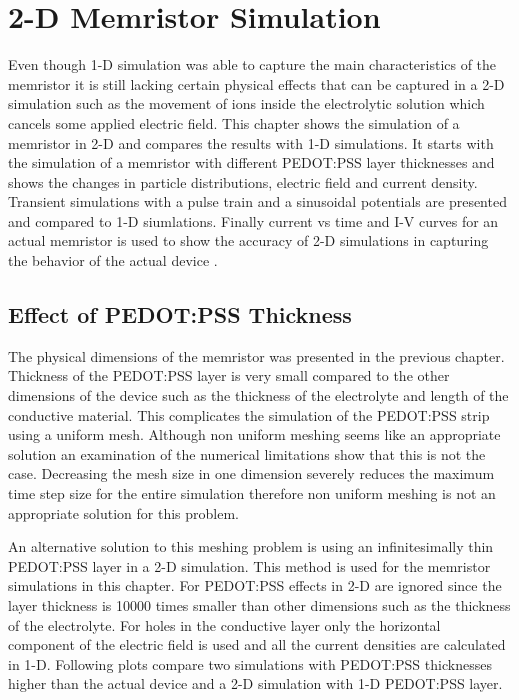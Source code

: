 
\chapter{2-D Memristor Simulation} %

\label{Chapter6} %

\begin{doublespace}

Even though 1-D simulation was able to capture the main characteristics of the memristor it is still lacking certain physical effects that can be captured in a 2-D simulation such as the movement of ions inside the electrolytic solution which cancels some applied electric field. This chapter shows the simulation of a memristor in 2-D and compares the results with 1-D simulations. It starts with the simulation of a memristor with different PEDOT:PSS layer thicknesses and shows the changes in particle distributions, electric field and current density. 
Transient simulations with a pulse train and a sinusoidal potentials are presented and compared to 1-D siumlations. Finally current vs time and I-V curves for an actual memristor is used to show the accuracy of 2-D simulations in capturing the behavior of the actual device .  

\section{Effect of PEDOT:PSS Thickness}

The physical dimensions of the memristor was presented in the previous chapter. Thickness of the PEDOT:PSS layer is very small compared to the other dimensions of the device such as the thickness of the electrolyte and length of the conductive material. This complicates the simulation of the PEDOT:PSS strip using a uniform mesh. Although non uniform meshing seems like an appropriate solution an examination of the numerical limitations show that this is not the case. Decreasing the mesh size in one dimension severely reduces the maximum time step size for the entire simulation therefore non uniform meshing is not an appropriate solution for this problem. 

An alternative solution to this meshing problem is using an infinitesimally thin PEDOT:PSS layer in a 2-D simulation. This method is used for the memristor simulations in this chapter. For PEDOT:PSS effects in 2-D are ignored since the layer thickness is 10000 times smaller than other dimensions such as the thickness of the electrolyte. For holes in the conductive layer only the horizontal component of the electric field is used and all the current densities are calculated in 1-D. Following plots compare two simulations with PEDOT:PSS thicknesses higher than the actual device and a 2-D simulation with 1-D PEDOT:PSS layer.  


\end{doublespace}
